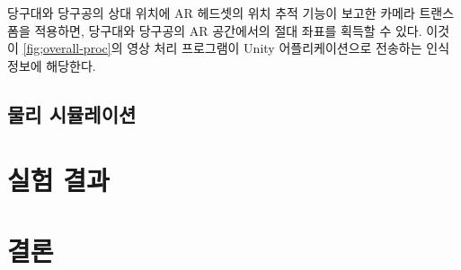 \documentclass[10pt]{oblivoir}
\begin{document}
당구대와 당구공의 상대 위치에 AR 헤드셋의 위치 추적 기능이 보고한 카메라 트랜스폼을 적용하면, 당구대와 당구공의 AR 공간에서의 절대 좌표를 획득할 수 있다. 이것이 \cref{fig;overall-proc}의 영상 처리 프로그램이 Unity 어플리케이션으로 전송하는 인식 정보에 해당한다.

\subsection{물리 시뮬레이션}





\section{실험 결과}



\section{결론}



\end{document}
